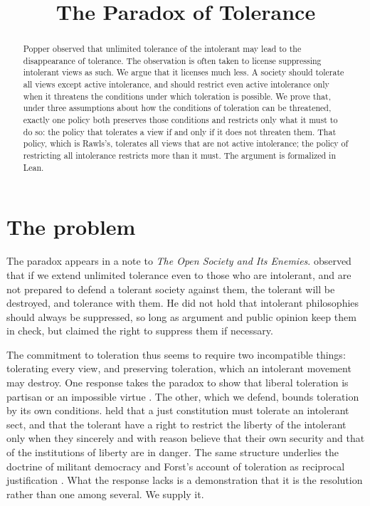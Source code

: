 \documentclass{situationist-preprint}
\title{The Paradox of Tolerance}
\begin{document}
\maketitle

\begin{abstract}
Popper observed that unlimited tolerance of the intolerant may lead to the disappearance of tolerance. The observation is often taken to license suppressing intolerant views as such. We argue that it licenses much less. A society should tolerate all views except active intolerance, and should restrict even active intolerance only when it threatens the conditions under which toleration is possible. We prove that, under three assumptions about how the conditions of toleration can be threatened, exactly one policy both preserves those conditions and restricts only what it must to do so: the policy that tolerates a view if and only if it does not threaten them. That policy, which is Rawls's, tolerates all views that are not active intolerance; the policy of restricting all intolerance restricts more than it must. The argument is formalized in Lean.
\end{abstract}

\section{The problem}

The paradox appears in a note to \emph{The Open Society and Its Enemies}. \citet[vol.~1, ch.~7, n.~4]{Popper1945} observed that if we extend unlimited tolerance even to those who are intolerant, and are not prepared to defend a tolerant society against them, the tolerant will be destroyed, and tolerance with them. He did not hold that intolerant philosophies should always be suppressed, so long as argument and public opinion keep them in check, but claimed the right to suppress them if necessary.

The commitment to toleration thus seems to require two incompatible things: tolerating every view, and preserving toleration, which an intolerant movement may destroy. One response takes the paradox to show that liberal toleration is partisan \citep{Marcuse1965} or an impossible virtue \citep{Williams1996}. The other, which we defend, bounds toleration by its own conditions. \citet[§35]{Rawls1971} held that a just constitution must tolerate an intolerant sect, and that the tolerant have a right to restrict the liberty of the intolerant only when they sincerely and with reason believe that their own security and that of the institutions of liberty are in danger. The same structure underlies the doctrine of militant democracy \citep{Loewenstein1937,Kirshner2014} and Forst's account of toleration as reciprocal justification \citep{Forst2013}. What the response lacks is a demonstration that it is the resolution rather than one among several. We supply it.
\end{document}
